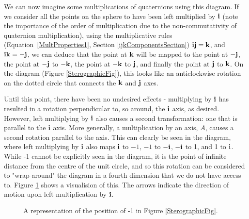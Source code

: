 \documentclass[10pt]{article}
\begin{document}
We can now imagine some multiplications of quaternions using this diagram. If we consider all the points on the sphere to have been left multiplied by $\vb{i}$ (note the importance of the order of multiplication due to the non-commutativity of quaternion multiplication), using the multiplicative rules (Equation \ref{MultProperties1}, Section \ref{ijkComponentsSection}) $\vb{ij} = \vb{k}$, and $\vb{ik} = -\vb{j}$, we can deduce that the point at $\vb{k}$ will be mapped to the point at $-\vb{j}$, the point at $-\vb{j}$ to $-\vb{k}$, the point at $-\vb{k}$ to $\vb{j}$, and finally the point at $\vb{j}$ to $\vb{k}$. On the diagram (Figure \ref{SterographicFig}), this looks like an anticlockwise rotation on the dotted circle that connects the $\vb{k}$ and $\vb{j}$ axes.

Until this point, there have been no undesired effects - multiplying by $\vb{i}$ has resulted in a rotation perpendicular to, so around, the $\vb{i}$ axis, as desired. However, left multiplying by $\vb{i}$ also causes a second transformation: one that is parallel to the $\vb{i}$ axis. More generally, a multiplication by an axis, $A$, causes a second rotation parallel to the axis. This can clearly be seen in the diagram, where left multiplying by $\vb{i}$ also maps $\vb{i}$ to $-1$, $-1$ to $-\vb{i}$, $-\vb{i}$ to 1, and 1 to $\vb{i}$. While -1 cannot be explicitly seen in the diagram, it is the point of infinite distance from the centre of the unit circle, and so this rotation can be considered to "wrap-around" the diagram in a fourth dimension that we do not have access to. Figure \ref{LeftMultIFig} shows a visualision of this. The arrows indicate the direction of motion upon left multiplication by $\vb{i}$.

\begin{figure}[H]
    \centering
    \caption{A representation of the position of -1 in Figure \ref{SterographicFig}.}
    \label{LeftMultIFig}
\end{figure}
\end{document}
